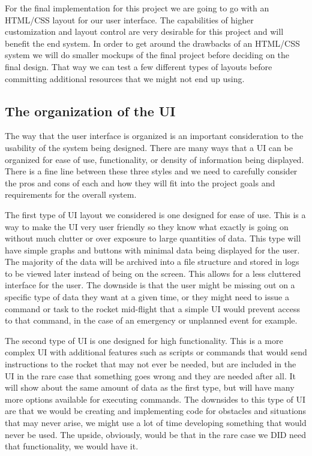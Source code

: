 \documentclass[10pt,draftclsnofoot,onecolumn,retainorgcmds]{IEEEtran}
\begin{document}
For the final implementation for this project we are going to go with an HTML/CSS layout for our user interface. The capabilities of higher customization and layout control are very desirable for this project and will benefit the end system. In order to get around the drawbacks of an HTML/CSS system we will do smaller mockups of the final project before deciding on the final design. That way we can test a few different types of layouts before committing additional resources that we might not end up using.\par

\subsection{The organization of the UI}
The way that the user interface is organized is an important consideration to the usability of the system being designed. There are many ways that a UI can be organized for ease of use, functionality, or density of information being displayed. There is a fine line between these three styles and we need to carefully consider the pros and cons of each and how they will fit into the project goals and requirements for the overall system. \par

The first type of UI layout we considered is one designed for ease of use. This is a way to make the UI very user friendly so they know what exactly is going on without much clutter or over exposure to large quantities of data. This type will have simple graphs and buttons with minimal data being displayed for the user. The majority of the data will be archived into a file structure and stored in logs to be viewed later instead of being on the screen. This allows for a less cluttered interface for the user. The downside is that the user might be missing out on a specific type of data they want at a given time, or they might need to issue a command or task to the rocket mid-flight that a simple UI would prevent access to that command, in the case of an emergency or unplanned event for example. \par

The second type of UI is one designed for high functionality. This is a more complex UI with additional features such as scripts or commands that would send instructions to the rocket that may not ever be needed, but are included in the UI in the rare case that something goes wrong and they are needed after all. It will show about the same amount of data as the first type, but will have many more options available for executing commands. The downsides to this type of UI are that we would be creating and implementing code for obstacles and situations that may never arise, we might use a lot of time developing something that would never be used. The upside, obviously, would be that in the rare case we DID need that functionality, we would have it. \par
\end{document}
